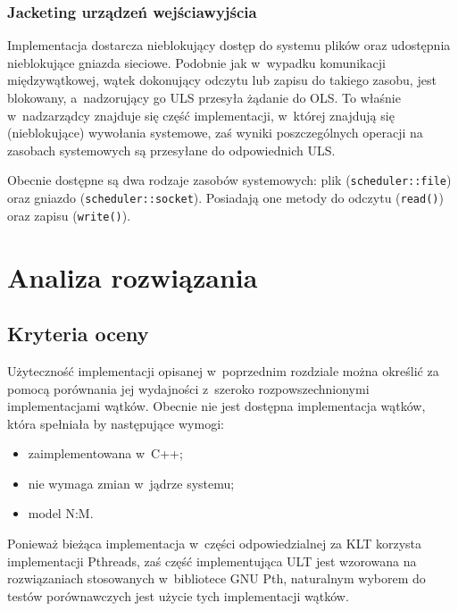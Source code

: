 \documentclass[12pt]{mwart}
\newcommand{\code}{\texttt}
\newcommand{\dcolon}{::}
\newcommand{\procbr}{()}
\begin{document}
\subsubsection{Jacketing urządzeń wejścia\dywiz wyjścia}
\indent
	Implementacja dostarcza nieblokujący dostęp do systemu plików oraz udostępnia nieblokujące gniazda sieciowe.
	Podobnie jak w~wypadku komunikacji międzywątkowej, wątek dokonujący odczytu lub zapisu do takiego zasobu, jest blokowany,
	a~nadzorujący go ULS przesyła żądanie do OLS.
	To właśnie w~nad\dywiz zarządcy znajduje się część implementacji, w~której znajdują się (nieblokujące) wywołania systemowe,
	zaś wyniki poszczególnych operacji na zasobach systemowych są przesyłane do odpowiednich ULS.
\par
%
\indent
	Obecnie dostępne są dwa rodzaje zasobów systemowych: plik \linebreak (\code{scheduler\dcolon file}) oraz gniazdo (\code{scheduler\dcolon socket}).
	Posiadają one metody do odczytu (\code{read\procbr}) oraz zapisu (\code{write\procbr}).
\par
%
\newpage
\section{Analiza rozwiązania}
\label{sec:analysis}
\subsection{Kryteria oceny}
\indent
	Użyteczność implementacji opisanej w~poprzednim rozdziale można określić za pomocą porównania jej wydajności z~szeroko rozpowszechnionymi
	implementacjami wątków. Obecnie nie jest dostępna implementacja wątków, która spełniała by następujące wymogi:
	\begin{itemize}
		\item zaimplementowana w~C++;
		\item nie wymaga zmian w~jądrze systemu;
		\item model N:M.
	\end{itemize}
	Ponieważ bieżąca implementacja w~części odpowiedzialnej za KLT korzysta implementacji Pthreads, zaś część implementująca ULT
	jest wzorowana na rozwiązaniach stosowanych w~bibliotece GNU Pth, naturalnym wyborem do testów porównawczych jest
	użycie tych implementacji wątków.
\par
%
\end{document}
